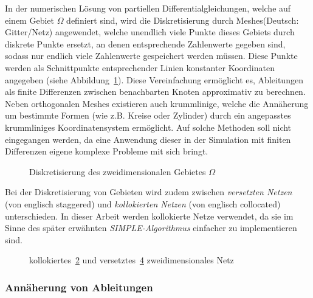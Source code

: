 In der numerischen Lösung von partiellen Differentialgleichungen, welche auf einem Gebiet $\Omega$ definiert sind, wird die Diskretisierung durch \glqq Meshes\grqq (Deutsch: Gitter/Netz) angewendet, welche unendlich viele Punkte dieses Gebiets durch diskrete Punkte ersetzt, an denen entsprechende Zahlenwerte gegeben sind, sodass nur endlich viele Zahlenwerte gespeichert werden müssen. Diese Punkte werden als Schnittpunkte entsprechender Linien konstanter Koordinaten angegeben (siehe Abbildung~\ref{fig:meshs}). Diese Vereinfachung ermöglicht es, Ableitungen als finite Differenzen zwischen benachbarten Knoten approximativ zu berechnen. Neben orthogonalen Meshes existieren auch krummlinige, welche die Annäherung um bestimmte Formen (wie z.B. Kreise oder Zylinder) durch ein angepasstes krummliniges Koordinatensystem ermöglicht. Auf solche Methoden soll nicht eingegangen werden, da eine Anwendung dieser in der Simulation mit finiten Differenzen eigene komplexe Probleme mit sich bringt.
\begin{figure}
    \centering
    \def\svgwidth{0.75\textwidth}
    
    \caption{Diskretisierung des zweidimensionalen Gebietes $\Omega$}
    \label{fig:meshs}
\end{figure}
Bei der Diskretisierung von Gebieten wird zudem zwischen \emph{versetzten Netzen} (von englisch \glqq staggered\grqq) und \emph{kollokierten Netzen} (von englisch \glqq collocated\grqq) unterschieden. In dieser Arbeit werden kollokierte Netze verwendet, da sie im Sinne des später erwähnten \emph{SIMPLE-Algorithmus} einfacher zu implementieren sind.
\begin{figure}
\centering
\begin{subfigure}{0.4\textwidth}
    \centering
    \def\svgwidth{\textwidth}
    
    \caption{}
    \label{fig:kollokiert_grid}
\end{subfigure}
\begin{subfigure}{0.4\textwidth}
\centering
    \def\svgwidth{\textwidth}
    
    \caption{}
    \label{fig:staggered_grid}
\end{subfigure}
\caption{kollokiertes~\ref{fig:kollokiert_grid} und versetztes~\ref{fig:staggered_grid} zweidimensionales Netz}
\end{figure}

\subsubsection{Annäherung von Ableitungen}


